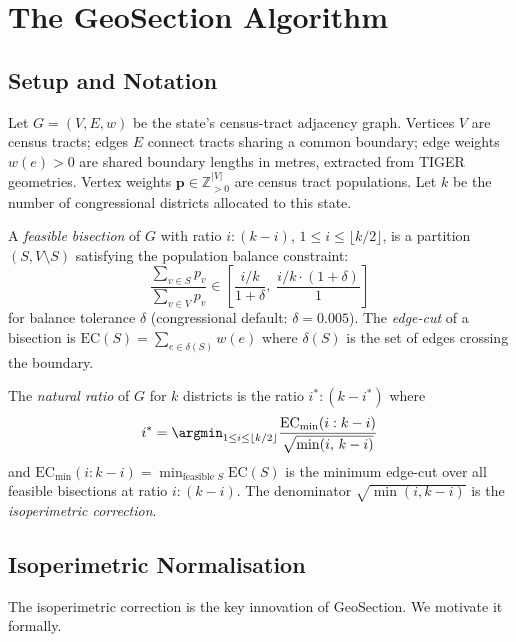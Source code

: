 \section{The GeoSection Algorithm}
\label{sec:algorithm}

\subsection{Setup and Notation}

Let $G = (V, E, w)$ be the state's census-tract adjacency graph.
Vertices $V$ are census tracts; edges $E$ connect tracts sharing a common
boundary; edge weights $w(e) > 0$ are shared boundary lengths in metres,
extracted from TIGER geometries.
Vertex weights $\mathbf{p} \in \mathbb{Z}_{>0}^{|V|}$ are census tract populations.
Let $k$ be the number of congressional districts allocated to this state.

\begin{definition}
A \emph{feasible bisection} of $G$ with ratio $i:(k-i)$, $1 \leq i \leq \lfloor k/2 \rfloor$,
is a partition $(S, V \setminus S)$ satisfying the population balance constraint:
\[
  \frac{\sum_{v \in S} p_v}{\sum_{v \in V} p_v} \in
  \left[\frac{i/k}{1 + \delta},\; \frac{i/k \cdot (1+\delta)}{1}\right]
\]
for balance tolerance $\delta$ (congressional default: $\delta = 0.005$).
The \emph{edge-cut} of a bisection is $\mathrm{EC}(S) = \sum_{e \in \delta(S)} w(e)$
where $\delta(S)$ is the set of edges crossing the boundary.
\end{definition}

\begin{definition}
The \emph{natural ratio} of $G$ for $k$ districts is the ratio $i^*:(k-i^*)$ where
\[
  i^* = \argmin_{1 \leq i \leq \lfloor k/2 \rfloor}
  \frac{\mathrm{EC}_{\min}(i:k-i)}{\sqrt{\min(i,\,k-i)}}
\]
and $\mathrm{EC}_{\min}(i:k-i) = \min_{\text{feasible } S} \mathrm{EC}(S)$
is the minimum edge-cut over all feasible bisections at ratio $i:(k-i)$.
The denominator $\sqrt{\min(i,k-i)}$ is the \emph{isoperimetric correction}.
\end{definition}

\subsection{Isoperimetric Normalisation}
\label{sec:normalisation}

The isoperimetric correction is the key innovation of GeoSection.
We motivate it formally.

